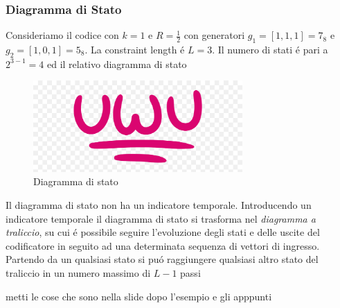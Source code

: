         \subsubsection{Diagramma di Stato}
            Consideriamo il codice con $k=1$ e $R=\frac{1}{2}$ con generatori $g_1 = [1,1,1] = 7_8$ e $g_2 = [1,0,1] = 5_8$.
            La constraint length é $L=3$. Il numero di stati é pari a $2^{3-1}=4$ ed il relativo diagramma di stato 
            \begin{figure}[H]
                \centering
                \includegraphics[width = 8cm]{media/uwu.png}
                \caption{Diagramma di stato}
            \end{figure}
            Il diagramma di stato non ha un indicatore temporale. Introducendo un indicatore temporale il diagramma di stato si trasforma
            nel \emph{diagramma a traliccio}, su cui é possibile seguire l'evoluzione degli stati e delle uscite del codificatore in seguito ad una 
            determinata sequenza di vettori di ingresso. Partendo da un qualsiasi stato si puó raggiungere qualsiasi altro
            stato del traliccio in un numero massimo di $L-1$ passi

            metti le cose che sono nella slide dopo l'esempio e gli apppunti 
